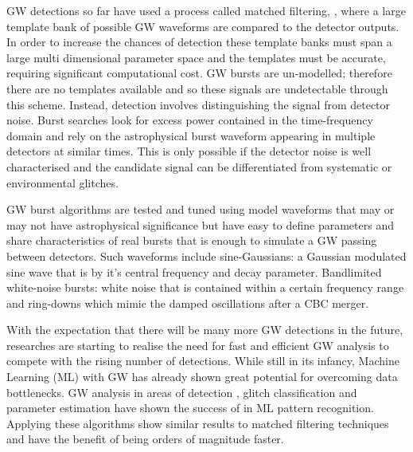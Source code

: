 \documentclass[12pt]{iopart}
\newcommand{\chris}[1]{\textbf{\textcolor{green}{CHRIS: #1}}}
\begin{document}
GW detections so far have used a process called matched filtering, \cite{Owen1998}, where a large template bank of possible GW waveforms are compared to the detector outputs. In order to increase the chances of detection these template banks must span a large multi dimensional parameter space and the templates must be accurate, requiring significant computational cost.  GW bursts are un-modelled; therefore there are no templates available and so these signals are undetectable through this scheme. Instead, detection involves distinguishing
the signal from detector noise. Burst searches look for excess power contained in the time-frequency domain and rely on the astrophysical burst waveform appearing in multiple detectors at similar times. This is only possible if the detector noise is
well characterised and the candidate signal can be differentiated from
systematic or environmental glitches. 

%
\ac{GW} burst algorithms \cite{Klimenko_2008, Aso_2008} are tested and tuned using model waveforms that may
or may not have astrophysical significance but have easy to define parameters
and share characteristics of real bursts that is enough to simulate a \ac{GW} passing between detectors. Such waveforms include sine-Gaussians: a Gaussian modulated sine wave that is by it's central frequency and decay parameter. Bandlimited white-noise bursts: white noise that is contained within a certain frequency range and ring-downs which mimic the damped oscillations after a CBC merger.

%

With the expectation that there will be many more \ac{GW} detections in the future, researches are starting to realise the need for fast and efficient \ac{GW} analysis to compete with the rising number of detections. While still in its infancy, Machine Learning (ML) with GW has already shown great potential for overcoming data bottlenecks. \ac{GW} analysis in areas of detection \cite{george2016deep,Gabbard2017,Gebhard_2019,Krastev_2020}, glitch classification \cite{Bahaadini, George_2018,Razzano_2018} and parameter estimation \cite{gabbard2019bayesian,shen2019deterministic,green2020gravitationalwave} have shown the success of in ML pattern recognition. Applying these algorithms show similar results to matched filtering techniques and have the benefit of being orders of magnitude faster. 
\end{document}
